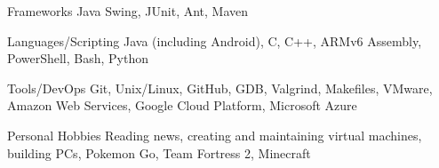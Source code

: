 

\begin{cvskills}

  \cvskill
    {Frameworks} %
    {Java Swing, JUnit, Ant, Maven} %

  \cvskill
    {Languages/Scripting} %
    {Java (including Android), C, C++, ARMv6 Assembly, PowerShell, Bash, Python} %
    
  \cvskill
    {Tools/DevOps} %
    {Git, Unix/Linux, GitHub, GDB, Valgrind, Makefiles, VMware, Amazon Web Services, Google Cloud Platform, Microsoft Azure} %

  \cvskill
  {Personal Hobbies} %
  {Reading news, creating and maintaining virtual machines, building PCs, Pokemon Go, Team Fortress 2, Minecraft} %

\end{cvskills}

